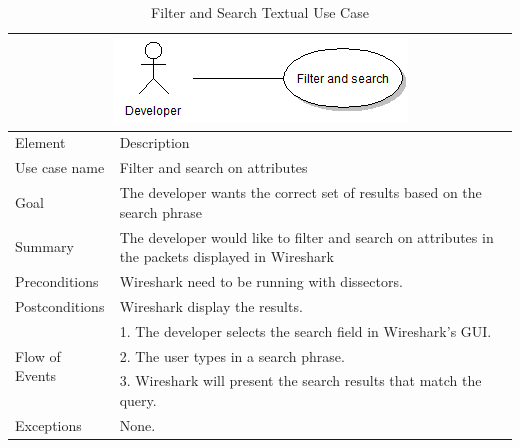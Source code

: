 \begin{table}[htbp] \footnotesize \center
\caption{Filter and Search Textual Use Case\label{tab:textual:filterandsearch}}
\begin{tabularx}{\textwidth}{l X}
	\multicolumn{2}{c}{\includegraphics[scale=0.8]{./planning/img/uc_filterandsearch}} \\
	\toprule
	Element & Description\\
	\midrule
	Use case name & Filter and search on attributes\\
	Goal & The developer wants the correct set of results based on the search phrase \\
	Summary & The developer would like to filter and search on attributes in the packets displayed in Wireshark \\
	Preconditions & Wireshark need to be running with dissectors. \\
	Postconditions & Wireshark display the results.\\
	\midrule
	\multirow{3}{*}{Flow of Events} & 1. The developer selects the search field in Wireshark's GUI.  \\
	& 2. The user types in a search phrase. \\
	& 3. Wireshark will present the search results that match the query. \\
	\midrule
	Exceptions & None. \\
	\bottomrule
\end{tabularx}
\end{table}

